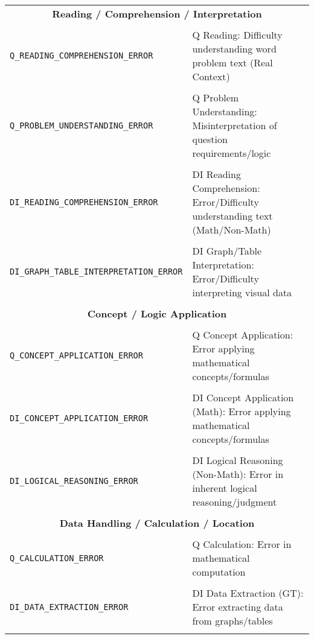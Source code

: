 \documentclass{article}
\begin{document}
{\begin{longtable}{|l|p{}|}
\multicolumn{2}{|c|}{\textbf{Reading / Comprehension / Interpretation}} \\\\
\hline
\texttt{Q\_READING\_COMPREHENSION\_ERROR} & Q Reading: Difficulty understanding word problem text (Real Context) \\\\
\texttt{Q\_PROBLEM\_UNDERSTANDING\_ERROR} & Q Problem Understanding: Misinterpretation of question requirements/logic \\\\
\texttt{DI\_READING\_COMPREHENSION\_ERROR} & DI Reading Comprehension: Error/Difficulty understanding text (Math/Non-Math) \\\\
\texttt{DI\_GRAPH\_TABLE\_INTERPRETATION\_ERROR} & DI Graph/Table Interpretation: Error/Difficulty interpreting visual data \\\\
\hline
\multicolumn{2}{|c|}{\textbf{Concept / Logic Application}} \\\\
\hline
\texttt{Q\_CONCEPT\_APPLICATION\_ERROR} & Q Concept Application: Error applying mathematical concepts/formulas \\\\
\texttt{DI\_CONCEPT\_APPLICATION\_ERROR} & DI Concept Application (Math): Error applying mathematical concepts/formulas \\\\
\texttt{DI\_LOGICAL\_REASONING\_ERROR} & DI Logical Reasoning (Non-Math): Error in inherent logical reasoning/judgment \\\\
\hline
\multicolumn{2}{|c|}{\textbf{Data Handling / Calculation / Location}} \\\\
\hline
\texttt{Q\_CALCULATION\_ERROR} & Q Calculation: Error in mathematical computation \\\\
\texttt{DI\_DATA\_EXTRACTION\_ERROR} & DI Data Extraction (GT): Error extracting data from graphs/tables \\\\

\end{longtable}}
\end{document}
